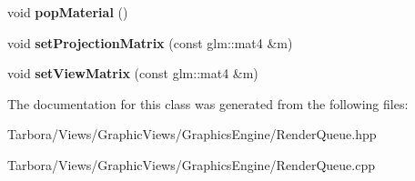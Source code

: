 \begin{DoxyCompactItemize}
\mbox{\label{classTarbora_1_1RenderQueue_a1d5f7081996e241f6d680ff0f72b2a91}} 
void {\bfseries pop\+Material} ()
\item 
\mbox{\label{classTarbora_1_1RenderQueue_a38f7ecb8298eb82da788887c24345ae7}} 
void {\bfseries set\+Projection\+Matrix} (const glm\+::mat4 \&m)
\item 
\mbox{\label{classTarbora_1_1RenderQueue_a525f21465a92dd64cbadfb0de0fe9422}} 
void {\bfseries set\+View\+Matrix} (const glm\+::mat4 \&m)
\end{DoxyCompactItemize}


The documentation for this class was generated from the following files\+:\begin{DoxyCompactItemize}
\item 
Tarbora/\+Views/\+Graphic\+Views/\+Graphics\+Engine/Render\+Queue.\+hpp\item 
Tarbora/\+Views/\+Graphic\+Views/\+Graphics\+Engine/Render\+Queue.\+cpp\end{DoxyCompactItemize}
